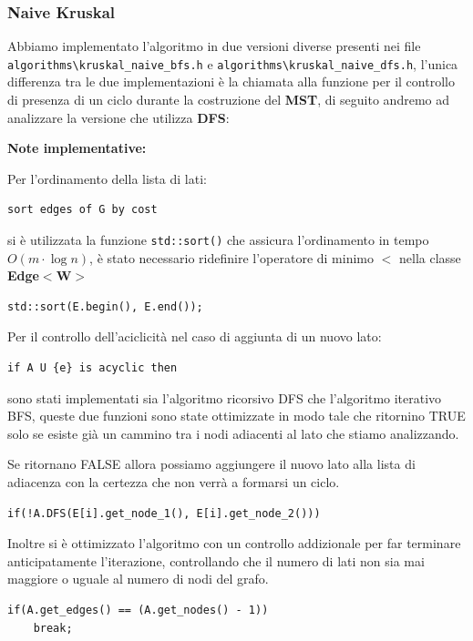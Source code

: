 \documentclass[]{article}
\begin{document}
\subsubsection{Naive Kruskal}
\begin{flushleft}
Abbiamo implementato l'algoritmo in due versioni diverse presenti nei file \verb|algorithms\kruskal_naive_bfs.h| e \verb|algorithms\kruskal_naive_dfs.h|, l'unica differenza tra le due implementazioni è la chiamata alla funzione per il controllo di presenza di un ciclo durante la costruzione del \textbf{MST}, di seguito andremo ad analizzare la versione che utilizza \textbf{DFS}:

\lstset{language=c++, style=mystyle}


\textbf{Note implementative:}

\medskip
Per l'ordinamento della lista di lati:

\begin{lstlisting}
sort edges of G by cost
\end{lstlisting}

\smallskip
si è utilizzata la funzione \verb|std::sort()| che assicura l'ordinamento in tempo $O(m\cdot\log n)$, è stato necessario ridefinire l'operatore di minimo \textbf{$<$} nella classe \textbf{Edge$<$W$>$}
 
\lstset{language=c++, style=mystyle, firstnumber=3} 	 	
\begin{lstlisting}
std::sort(E.begin(), E.end());
\end{lstlisting}

\medskip
Per il controllo dell'aciclicità nel caso di aggiunta di un nuovo lato:

\begin{lstlisting}
if A U {e} is acyclic then
\end{lstlisting}

\smallskip
sono stati implementati sia l'algoritmo ricorsivo DFS che l'algoritmo iterativo BFS, queste due funzioni sono state ottimizzate in modo tale che ritornino TRUE solo se esiste già un cammino tra i nodi adiacenti al lato che stiamo analizzando.

Se ritornano FALSE allora possiamo aggiungere il nuovo lato alla lista di adiacenza con la certezza che non verrà a formarsi un ciclo.

\lstset{language=c++, style=mystyle, firstnumber=5}
\begin{lstlisting}
if(!A.DFS(E[i].get_node_1(), E[i].get_node_2()))
\end{lstlisting}

\medskip
Inoltre si è ottimizzato l'algoritmo con un controllo addizionale per far terminare anticipatamente l'iterazione, controllando che il numero di lati non sia mai maggiore o uguale al numero di nodi del grafo.

\lstset{language=c++, style=mystyle, firstnumber=7}
\begin{lstlisting}
if(A.get_edges() == (A.get_nodes() - 1))
    break;
\end{lstlisting}
\end{flushleft}
\end{document}
